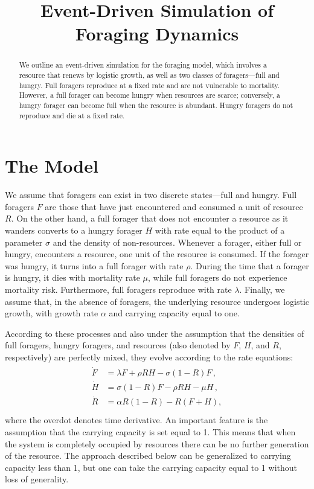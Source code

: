\documentclass[11pt]{iopart}
\begin{document}
\title{Event-Driven Simulation of Foraging Dynamics}


\begin{abstract}

  We outline an event-driven simulation for the foraging model, which
  involves a resource that renews by logistic growth, as well as two classes
  of foragers---full and hungry.  Full foragers reproduce at a fixed rate and
  are not vulnerable to mortality.  However, a full forager can become hungry
  when resources are scarce; conversely, a hungry forager can become full
  when the resource is abundant.  Hungry foragers do not reproduce and die at
  a fixed rate.
\end{abstract}


\section{The Model}

We assume that foragers can exist in two discrete states---full and hungry.
Full foragers $F$ are those that have just encountered and consumed a unit of
resource $R$.  On the other hand, a full forager that does not encounter a
resource as it wanders converts to a hungry forager $H$ with rate equal to
the product of a parameter $\sigma$ and the density of non-resources.
Whenever a forager, either full or hungry, encounters a resource, one unit of
the resource is consumed.  If the forager was hungry, it turns into a full
forager with rate $\rho$.  During the time that a forager is hungry, it dies
with mortality rate $\mu$, while full foragers do not experience mortality
risk.  Furthermore, full foragers reproduce with rate $\lambda$.  Finally, we
assume that, in the absence of foragers, the underlying resource undergoes
logistic growth, with growth rate $\alpha$ and carrying capacity equal to
one.

According to these processes and also under the assumption that the densities
of full foragers, hungry foragers, and resources (also denoted by $F$,
$H$, and $R$, respectively) are perfectly mixed, they evolve according to the
rate equations:
\begin{align}
  \label{RE}
\begin{split}
\dot F &= \lambda F + \rho  RH - \sigma (1-R)F\,,\\
\dot H &= \sigma (1-R)F - \rho RH - \mu H\,, \\
\dot R &= \alpha R(1-R) -  R(F+H),\\
\end{split}
\end{align}
where the overdot denotes time derivative.  An important feature is the
assumption that the carrying capacity is set equal to 1.  This means that
when the system is completely occupied by resources there can be no further
generation of the resource.  The approach described below can be generalized
to carrying capacity less than 1, but one can take the carrying capacity
equal to 1 without loss of generality.
\end{document}
